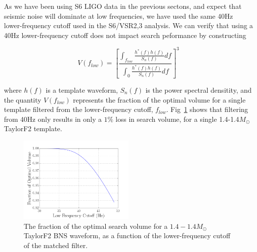 As we have been using S6 LIGO data in the previous sectons, and expect that seismic noise will dominate at low frequencies, we have used the same 40Hz lower-frequency cutoff used in the S6/VSR2,3 analysis. We can verify that using a 40Hz lower-frequency cutoff does not impact search peformance by constructing

\begin{equation}
V(f_{low}) = \left[ \frac{\int_{f_{low}} \frac{h^{*}(f)h(f)}{S_n(f)} df}{\int_{0} \frac{h^*(f)h(f)}{S_n(f)} df} \right]^3
\end{equation}

where $h(f)$ is a template waveform, $S_n(f)$ is the power spectral densitity, and the quantity $V(f_{low})$ represents the fraction of the optimal volume for a single template
filtered from the lower-frequency cutoff, $f_{low}$. Fig~\ref{fig:flow} shows that filtering from 40Hz only results in only a $1\%$ loss in search volume, for a single 1.4-1.4$M_\odot$ TaylorF2 template. 




\begin{figure}
\centering
\includegraphics[width=0.5\textwidth]{papers/bns_o1_dev/figures/flow.png}
\caption{\label{fig:flow} 
The fraction of the optimal search volume for a $1.4-1.4 M_\odot$ TaylorF2 BNS waveform, as a function of the lower-frequency cutoff of the matched filter. 
}
\end{figure}


